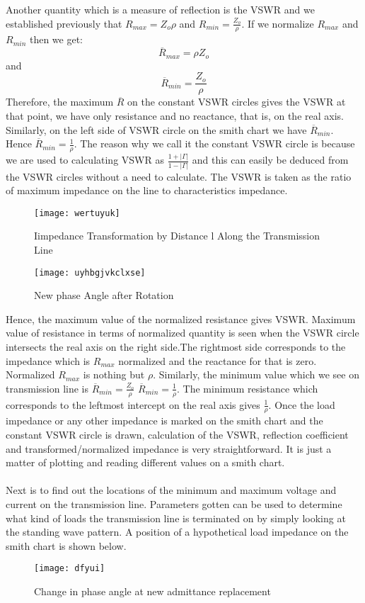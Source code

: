   Another quantity which is a measure of reflection is the VSWR and we established previously that $R_{max} = Z_{o}\rho$ and $R_{min} = \frac{Z_o}{\rho}$. If we normalize $R_{max}$ and $R_{min}$ then we get:
  \begin{equation}
  \overline{R}_{max} = {\rho}Z_o 
  \end{equation}
  and
  \begin{equation}
  \overline{R}_{min} = \frac{Z_o}{\rho}
  \end{equation}
    Therefore, the maximum $\overline{R}$ on the constant VSWR circles gives the VSWR at that point, we have only resistance and no reactance, that is, on the real axis. Similarly, on the left side of VSWR circle on the smith chart we have $\overline{R}_{min}$. Hence $\overline{R}_{min} = \frac{1}{\rho}$. The reason why we call it the constant VSWR circle is because we are used to calculating VSWR as $\frac{1 + |\Gamma|}{1 - |\Gamma|}$ and this can easily be deduced from the VSWR circles without a need to calculate.
  The VSWR is taken as the ratio of maximum impedance on the line to characteristics impedance.
  \begin{figure}[h]
  	\centering
  	\texttt{[image: wertuyuk]}
  	\caption{Iimpedance Transformation by Distance l Along the Transmission Line}
  	\label{fig:wertuyuk}
  \end{figure}
\begin{figure}[h]
	\centering
	\texttt{[image: uyhbgjvkclxse]}
	\caption{New phase Angle after Rotation}
	\label{fig:uyhbgjvkclxse}
\end{figure}

  Hence, the maximum value of the normalized resistance gives VSWR. Maximum value of resistance in terms of normalized quantity is seen when the VSWR circle intersects the real axis on the right side.The rightmost side corresponds to the impedance which is $R_{max}$ normalized and the reactance for that is zero. Normalized $R_{max}$ is nothing but $\rho$. Similarly, the minimum value which we see on transmission line is $\overline{R}_{min} = \frac{Z_o}{\rho}$ $\overline{R}_{min} = \frac{1}{\rho}$. The minimum resistance which corresponds to the leftmost intercept on the real axis gives $\frac{1}{\rho}$. Once the load impedance or any other impedance is marked on the smith chart and the constant VSWR circle is drawn, calculation of the VSWR, reflection coefficient and transformed/normalized impedance is very straightforward. It is just a matter of plotting and reading different values on a smith chart.\\\\
  Next is to find out the locations of the  minimum and maximum voltage and current on the transmission line. Parameters gotten can be used to determine what kind of loads the transmission line is terminated on by simply looking at the standing wave pattern. A position of a hypothetical load impedance on the smith chart is shown below.
\begin{figure}[h]
	\centering
	\texttt{[image: dfyui]}
	\caption{Change in phase angle at new admittance replacement}
	\label{fig:dfyui}
\end{figure}

